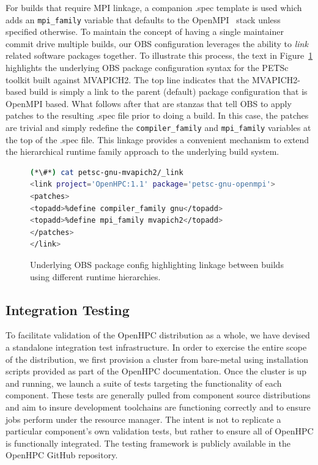 \documentclass{sig-alternate-05-2015}
\begin{document}
For builds that require MPI linkage, a companion .spec template is used which
adds an \texttt{mpi\_family} variable that defaults to the
OpenMPI~\cite{gabriel04:openmpi} stack unless specified otherwise.  To
maintain the concept of having a single maintainer commit drive multiple
builds, our OBS configuration leverages the ability to {\em link} related software
packages together. To illustrate this process, the text in
Figure~\ref{fig:obs_link} highlights the underlying
OBS package configuration syntax for the PETSc toolkit built against
MVAPICH2. The top line indicates that the MVAPICH2-based build is simply a link
to the parent (default) package configuration that is OpenMPI based.  What
follows after that are stanzas that tell OBS to apply patches to the resulting
.spec file prior to doing a build. In this case, the patches are trivial and
simply redefine the \texttt{compiler\_family} and \texttt{mpi\_family} variables at
the top of the .spec file.  This linkage provides a convenient mechanism to
extend the hierarchical runtime family approach to the underlying build system.

\begin{figure}[h]
\begin{lstlisting}[language=bash,keywords={},basicstyle=\fontsize{7.8}{10}\ttfamily,keepspaces]
(*\#*) cat petsc-gnu-mvapich2/_link
<link project='OpenHPC:1.1' package='petsc-gnu-openmpi'>
<patches>
<topadd>%define compiler_family gnu</topadd>
<topadd>%define mpi_family mvapich2</topadd>
</patches>
</link>
\end{lstlisting}
\vspace*{-0.3cm}
\caption{Underlying OBS package config highlighting linkage between builds
  using different runtime hierarchies.}
\label{fig:obs_link}
\end{figure}

\subsection{Integration Testing} \label{sec:integ_testing}
To facilitate validation of the OpenHPC distribution as a whole, we have
devised a standalone integration test infrastructure. In order to exercise the
entire scope of the distribution, we first provision a cluster from bare-metal
using installation scripts provided as part of the OpenHPC documentation. Once
the cluster is up and running, we launch a suite of tests targeting the
functionality of each component. These tests are generally
pulled from component source distributions and aim to insure development
toolchains are functioning correctly and to ensure jobs perform under the
resource manager. The intent is not to replicate a particular component's own
validation tests, but rather to ensure all of OpenHPC is functionally
integrated. The testing framework is publicly available in the OpenHPC GitHub
repository.
\end{document}
